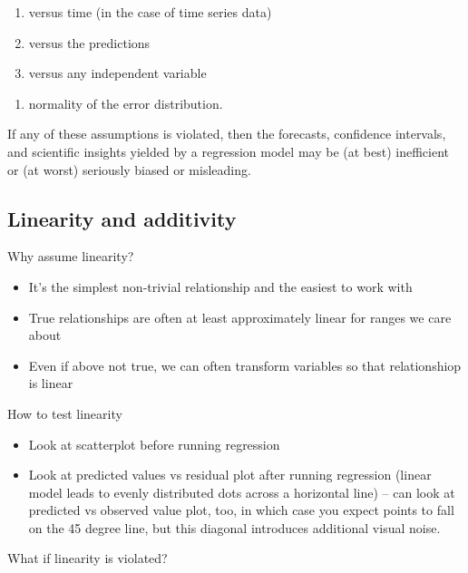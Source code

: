 \documentclass[
  letterpaper,
  DIV=11,
  numbers=noendperiod]{scrreprt}
\providecommand{\tightlist}{%
  \setlength{\itemsep}{0pt}\setlength{\parskip}{0pt}}\usepackage{longtable,booktabs,array}
\begin{document}
\begin{enumerate}
\def\labelenumi{(\alph{enumi})}
\item
  versus time (in the case of time series data)
\item
  versus the predictions
\item
  versus any independent variable
\end{enumerate}

\begin{enumerate}
\def\labelenumi{(\roman{enumi})}
\setcounter{enumi}{3}
\tightlist
\item
  normality of the error distribution.
\end{enumerate}

If any of these assumptions is violated, then the forecasts, confidence
intervals, and scientific insights yielded by a regression model may be
(at best) inefficient or (at worst) seriously biased or misleading.

\hypertarget{linearity-and-additivity}{%
\subsection{Linearity and additivity}\label{linearity-and-additivity}}

Why assume linearity?

\begin{itemize}
\item
  It's the simplest non-trivial relationship and the easiest to work
  with
\item
  True relationships are often at least approximately linear for ranges
  we care about
\item
  Even if above not true, we can often transform variables so that
  relationshiop is linear
\end{itemize}

How to test linearity

\begin{itemize}
\item
  Look at scatterplot before running regression
\item
  Look at predicted values vs residual plot after running regression
  (linear model leads to evenly distributed dots across a horizontal
  line) -- can look at predicted vs observed value plot, too, in which
  case you expect points to fall on the 45 degree line, but this
  diagonal introduces additional visual noise.
\end{itemize}

What if linearity is violated?
\end{document}
